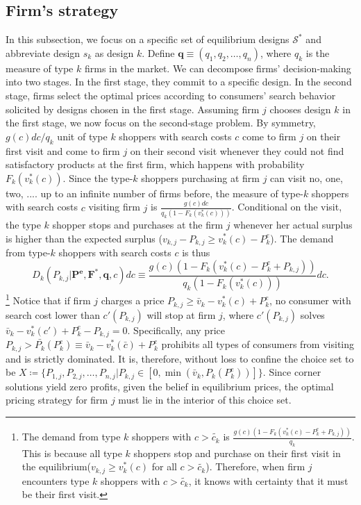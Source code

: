 \documentclass[14pt]{article}
\theoremstyle{plain}
\theoremstyle{definition}
\theoremstyle{remark}
\DeclareRobustCommand\1{\futurelet\oneNext\oneCheck}
\renewcommand{\S}{\mathcal{S}}
\begin{document}
\subsection{Firm's strategy }\label{subsection:firm}
In this subsection, we focus on a specific set of equilibrium designs $\S^*$ and abbreviate design $s_k$ as design $k$. 
Define $\mathbf{q}\equiv (q_{1}, q_{2}, \dots, q_{n})$, where $q_{k}$ is the measure of type $k$ firms in the market. We can decompose firms' decision-making into two stages. In the first stage, they commit to a specific design. In the second stage, firms select the optimal prices according to consumers' search behavior solicited by designs chosen in the first stage. Assuming firm $j$ chooses design $k$ in the first stage, we now focus on the second-stage problem. By symmetry, $g(c)dc/q_{k}$ unit of type $k$ shoppers with search costs $c$ come to firm $j$ on their first visit and come to firm $j$ on their second visit whenever they could not find satisfactory products at the first firm, which happens with probability $F_{k}(v_{k}^*(c))$. Since the type-$k$ shoppers purchasing at firm $j$ can visit no, one, two, .... up to an infinite number of firms before, the measure of type-$k$ shoppers with search costs $c$ visiting firm $j$ is $\frac{g(c)dc}{q_{k}\left(1-F_{k}(v_{k}^*(c))\right)}$. Conditional on the visit, the type $k$ shopper stops and purchases at the firm $j$ whenever her actual surplus is higher than the expected surplus ($v_{{k}, j}-P_{{k},j}\geq v_{k}^*(c) - P_{k}^e$). The demand from type-$k$ shoppers with search costs $c$ is thus
%
\begin{equation}\label{eq:demand_s_k}
 D_{k}( P_{{k},j}| \mathbf{P^e}, \mathbf{F^*}, \mathbf{q}, c )dc \equiv \frac{g(c)\left(1-F_{{k}}(v_{k}^*(c)-P_{k}^e+P_{k,j})\right)}{q_k\left(1-F_{k}(v_{k}^*(c))\right)}dc.
\end{equation}
 \footnote{The demand from type $k$ shoppers with $c>\tilde{c_{k}}$ is $\frac{g(c)\left(1-F_{k}(v_k^*(c)-P_k^e+P_{k,j})\right)}{q_k}$. This is because all type $k$ shoppers stop and purchase on their first visit in the equilibrium($v_{k,j} \geq v_k^*(c)$ for all $c>\tilde{c_k}$). Therefore, when firm $j$ encounters type $k$ shoppers with $c>\tilde{c_k}$, it knows with certainty that it must be their first visit.}     Notice that if firm $j$ charges a price $P_{k,j}\geq \bar{v}_{k}-v_k^*(c)+P_k^e$, no consumer with search cost lower than $c'(P_{k,j})$ will stop at firm $j$, where $c'(P_{k,j})$ solves $\bar{v}_{k}-v_k^*(c')+P_k^e-P_{k,j}=0$. Specifically, any price $P_{k,j}> \bar{P_k}(P_k^e)\equiv \bar{v}_{k}-v_k^*(\bar{c})+P_k^e$ prohibits all types of consumers from visiting and is strictly dominated. It is, therefore, without loss to confine the choice set to be $X \coloneqq \{ P_{1,j}, P_{2,j}, \dots, P_{n,j}| P_{k,j}\in [0, \min \left(\bar{v}_k, P_k(P_k^e)\right)] \}$. Since corner solutions yield zero profits, given the belief in equilibrium prices, the optimal pricing strategy for firm $j$ must lie in the interior of this choice set.
\end{document}

